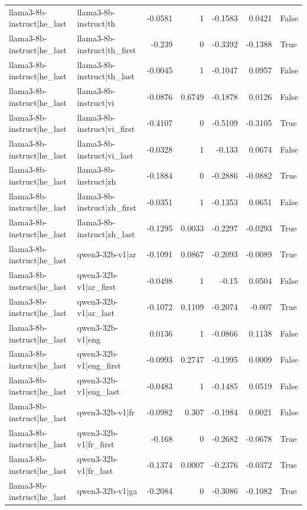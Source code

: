 \begin{table}
\begin{tabular}{l l r r r r l}
llama3-8b-instruct|he_last & llama3-8b-instruct|th & -0.0581 & 1 & -0.1583 & 0.0421 & False \\
llama3-8b-instruct|he_last & llama3-8b-instruct|th_first & -0.239 & 0 & -0.3392 & -0.1388 & True \\
llama3-8b-instruct|he_last & llama3-8b-instruct|th_last & -0.0045 & 1 & -0.1047 & 0.0957 & False \\
llama3-8b-instruct|he_last & llama3-8b-instruct|vi & -0.0876 & 0.6749 & -0.1878 & 0.0126 & False \\
llama3-8b-instruct|he_last & llama3-8b-instruct|vi_first & -0.4107 & 0 & -0.5109 & -0.3105 & True \\
llama3-8b-instruct|he_last & llama3-8b-instruct|vi_last & -0.0328 & 1 & -0.133 & 0.0674 & False \\
llama3-8b-instruct|he_last & llama3-8b-instruct|zh & -0.1884 & 0 & -0.2886 & -0.0882 & True \\
llama3-8b-instruct|he_last & llama3-8b-instruct|zh_first & -0.0351 & 1 & -0.1353 & 0.0651 & False \\
llama3-8b-instruct|he_last & llama3-8b-instruct|zh_last & -0.1295 & 0.0033 & -0.2297 & -0.0293 & True \\
llama3-8b-instruct|he_last & qwen3-32b-v1|ar & -0.1091 & 0.0867 & -0.2093 & -0.0089 & True \\
llama3-8b-instruct|he_last & qwen3-32b-v1|ar_first & -0.0498 & 1 & -0.15 & 0.0504 & False \\
llama3-8b-instruct|he_last & qwen3-32b-v1|ar_last & -0.1072 & 0.1109 & -0.2074 & -0.007 & True \\
llama3-8b-instruct|he_last & qwen3-32b-v1|eng & 0.0136 & 1 & -0.0866 & 0.1138 & False \\
llama3-8b-instruct|he_last & qwen3-32b-v1|eng_first & -0.0993 & 0.2747 & -0.1995 & 0.0009 & False \\
llama3-8b-instruct|he_last & qwen3-32b-v1|eng_last & -0.0483 & 1 & -0.1485 & 0.0519 & False \\
llama3-8b-instruct|he_last & qwen3-32b-v1|fr & -0.0982 & 0.307 & -0.1984 & 0.0021 & False \\
llama3-8b-instruct|he_last & qwen3-32b-v1|fr_first & -0.168 & 0 & -0.2682 & -0.0678 & True \\
llama3-8b-instruct|he_last & qwen3-32b-v1|fr_last & -0.1374 & 0.0007 & -0.2376 & -0.0372 & True \\
llama3-8b-instruct|he_last & qwen3-32b-v1|ga & -0.2084 & 0 & -0.3086 & -0.1082 & True \\

\end{tabular}
\end{table}
